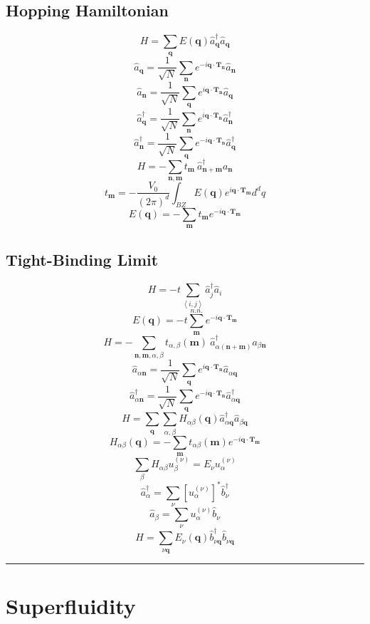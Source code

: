 \documentclass[12pt]{extarticle}
\newcommand{\average}[1]{\ensuremath{\left\langle #1 \right\rangle}}
\newcommand{\commutator}[1]{\ensuremath{\left[ #1 \right]}}
\newcommand{\creation}[1]{\hat{#1}^{\dagger}}
\newcommand{\mysection}[1]{
\vspace{1mm}
\hrule
\section{\Huge{#1}}}
\begin{document}
\begin{multicols*}{2}
\subsection{Hopping Hamiltonian}
$$H= \sum_{\mathbf{q}} E(\mathbf{q}) \creation{a}_{\mathbf{q}} \hat{a}_{\mathbf{q}}$$
$$\hat{a}_{\mathbf{q}}= \dfrac{1}{\sqrt{N}} \sum_{\mathbf{n}} e^{-i \mathbf{q} \cdot \mathbf{T_n}} \hat{a}_{\mathbf{n}}$$
$$\hat{a}_{\mathbf{n}}= \dfrac{1}{\sqrt{N}} \sum_{\mathbf{q}} e^{i \mathbf{q} \cdot \mathbf{T_n}} \hat{a}_{\mathbf{q}}$$
$$\creation{a}_{\mathbf{q}}= \dfrac{1}{\sqrt{N}} \sum_{\mathbf{n}} e^{i \mathbf{q} \cdot \mathbf{T_n}} \creation{a}_{\mathbf{n}}$$
$$\creation{a}_{\mathbf{n}}= \dfrac{1}{\sqrt{N}} \sum_{\mathbf{q}} e^{-i \mathbf{q} \cdot \mathbf{T_n}} \creation{a}_{\mathbf{q}}$$
$$H=- \sum_{\mathbf{n},\mathbf{m}}  t_{\mathbf{m}} \: \creation{a}_{\mathbf{n+m}} a_{\mathbf{n}}$$
$$t_{\mathbf{m}}=-\dfrac{V_0}{(2\pi)^d}\int_{BZ} E(\mathbf{q}) e^{i \textbf{q} \cdot \mathbf{T_m}} d^dq$$
$$E(\mathbf{q})= -\sum_{\mathbf{m}} t_{\mathbf{m}} e^{-i \mathbf{q} \cdot \mathbf{T_m}}$$

\subsection{Tight-Binding Limit}
$$H= -t \sum_{\average{i,j}} \creation{a}_{j} \hat{a}_{i}$$
$$E(\mathbf{q})= -t\sum_{\mathbf{m}}^{n.n.} e^{-i \mathbf{q} \cdot \mathbf{T_m}}$$
$$H=- \sum_{\mathbf{n},\mathbf{m}, \alpha, \beta}  t_{\alpha, \beta}(\mathbf{m}) \: \creation{a}_{\alpha(\mathbf{n+m})} a_{\beta \mathbf{n}}$$
$$\hat{a}_{\alpha\mathbf{n}}= \dfrac{1}{\sqrt{N}} \sum_{\mathbf{q}} e^{i \mathbf{q} \cdot \mathbf{T_n}} \hat{a}_{\alpha\mathbf{q}}$$
$$\creation{a}_{\alpha\mathbf{n}}= \dfrac{1}{\sqrt{N}} \sum_{\mathbf{q}} e^{-i \mathbf{q} \cdot \mathbf{T_n}} \creation{a}_{\alpha\mathbf{q}}$$
$$H=\sum_{\mathbf{q}} \sum_{\alpha, \beta} H_{\alpha \beta}(\mathbf{q}) \creation{a}_{\alpha \mathbf{q}} \hat{a}_{\beta \mathbf{q}}$$
$$H_{\alpha \beta}(\mathbf{q})= -\sum_{\mathbf{m}} t_{\alpha \beta}(\mathbf{m}) e^{-i \mathbf{q} \cdot \mathbf{T_m}}$$
$$\sum_{\beta} H_{\alpha \beta} u_{\beta}^{(\nu)}= E_{\nu} u_{\alpha}^{(\nu)}$$
$$\creation{a}_{\alpha}=\sum_{\nu} \commutator{u_{\alpha}^{(\nu)}}^* \creation{b}_{\nu}$$
$$\hat{a}_{\beta}=\sum_{\nu} u_{\alpha}^{(\nu)} \hat{b}_{\nu}$$
$$H=\sum_{\nu \mathbf{q}} E_{\nu} (\mathbf{q}) \creation{b}_{\nu \mathbf{q}} \hat{b}_{\nu \mathbf{q}}$$

\mysection{Superfluidity}


\end{multicols*}
\end{document}
